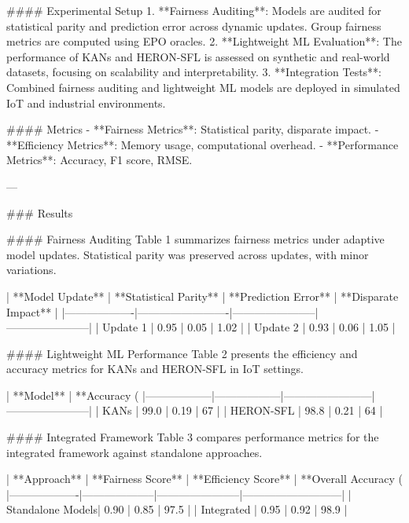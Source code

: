 #### Experimental Setup
1. **Fairness Auditing**: Models are audited for statistical parity and prediction error across dynamic updates. Group fairness metrics are computed using EPO oracles.
2. **Lightweight ML Evaluation**: The performance of KANs and HERON-SFL is assessed on synthetic and real-world datasets, focusing on scalability and interpretability.
3. **Integration Tests**: Combined fairness auditing and lightweight ML models are deployed in simulated IoT and industrial environments.

#### Metrics
- **Fairness Metrics**: Statistical parity, disparate impact.
- **Efficiency Metrics**: Memory usage, computational overhead.
- **Performance Metrics**: Accuracy, F1 score, RMSE.

---

### Results

#### Fairness Auditing
Table 1 summarizes fairness metrics under adaptive model updates. Statistical parity was preserved across updates, with minor variations.

| **Model Update** | **Statistical Parity** | **Prediction Error** | **Disparate Impact** |
|-------------------|-------------------------|-----------------------|-----------------------|
| Update 1         | 0.95                   | 0.05                 | 1.02                 |
| Update 2         | 0.93                   | 0.06                 | 1.05                 |

#### Lightweight ML Performance
Table 2 presents the efficiency and accuracy metrics for KANs and HERON-SFL in IoT settings.

| **Model**       | **Accuracy (%
|------------------|------------------|------------------------|-----------------------|
| KANs            | 99.0            | 0.19                  | 67                   |
| HERON-SFL       | 98.8            | 0.21                  | 64                   |

#### Integrated Framework
Table 3 compares performance metrics for the integrated framework against standalone approaches.

| **Approach**     | **Fairness Score** | **Efficiency Score** | **Overall Accuracy (%
|-------------------|--------------------|-----------------------|---------------------------|
| Standalone Models| 0.90              | 0.85                 | 97.5                     |
| Integrated       | 0.95              | 0.92                 | 98.9                     |

